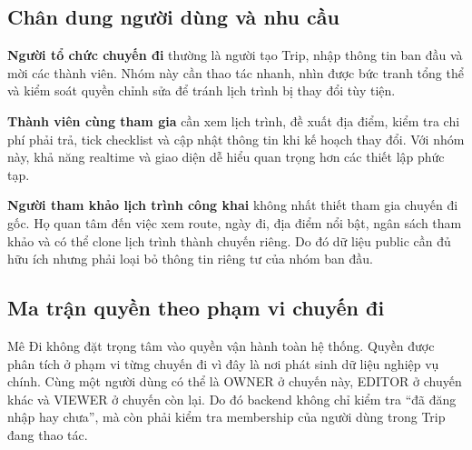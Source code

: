 \documentclass[a4paper]{report}
\newcommand{\ProjectName}{Mê Đi}
\begin{document}
\subsection{Chân dung người dùng và nhu cầu}

\textbf{Người tổ chức chuyến đi} thường là người tạo Trip, nhập thông tin ban đầu và mời các thành viên. Nhóm này cần thao tác nhanh, nhìn được bức tranh tổng thể và kiểm soát quyền chỉnh sửa để tránh lịch trình bị thay đổi tùy tiện.

\textbf{Thành viên cùng tham gia} cần xem lịch trình, đề xuất địa điểm, kiểm tra chi phí phải trả, tick checklist và cập nhật thông tin khi kế hoạch thay đổi. Với nhóm này, khả năng realtime và giao diện dễ hiểu quan trọng hơn các thiết lập phức tạp.

\textbf{Người tham khảo lịch trình công khai} không nhất thiết tham gia chuyến đi gốc. Họ quan tâm đến việc xem route, ngày đi, địa điểm nổi bật, ngân sách tham khảo và có thể clone lịch trình thành chuyến riêng. Do đó dữ liệu public cần đủ hữu ích nhưng phải loại bỏ thông tin riêng tư của nhóm ban đầu.

\subsection{Ma trận quyền theo phạm vi chuyến đi}

\ProjectName{} không đặt trọng tâm vào quyền vận hành toàn hệ thống. Quyền được phân tích ở phạm vi từng chuyến đi vì đây là nơi phát sinh dữ liệu nghiệp vụ chính. Cùng một người dùng có thể là OWNER ở chuyến này, EDITOR ở chuyến khác và VIEWER ở chuyến còn lại. Do đó backend không chỉ kiểm tra ``đã đăng nhập hay chưa'', mà còn phải kiểm tra membership của người dùng trong Trip đang thao tác.
\end{document}
